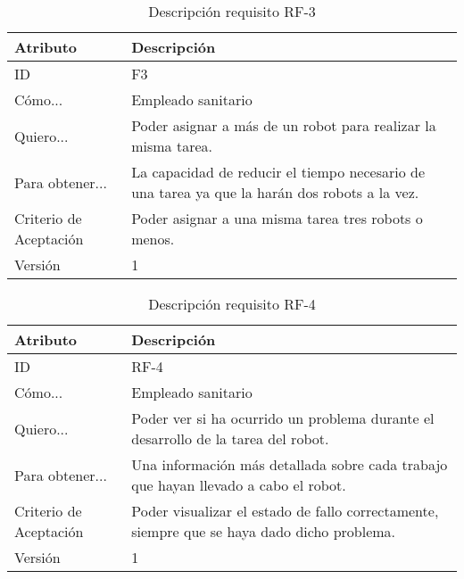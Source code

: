 \begin{table}[H]
    \label{tab:reqF3}
 	\caption{Descripción requisito RF-3}
	\centering
	
	\begin{tabular}{C{3cm}|C{12cm}}
 		\toprule
 		\textbf{Atributo} & \textbf{Descripción} \\
 		\midrule
 	    ID & F3 \\
 	    Cómo... & Empleado sanitario \\
 	    Quiero... & Poder asignar a más de un robot para realizar la misma tarea. \\
 	    Para obtener... & La capacidad de reducir el tiempo necesario de una tarea ya que la harán dos robots a la vez.  \\
 	    Criterio de Aceptación & Poder asignar a una misma tarea tres robots o menos. \\
 	    Versión & 1 \\
 		\bottomrule
 		\end{tabular}
\end{table}

\begin{table}[H]
    \label{tab:reqF4}
 	\caption{Descripción requisito RF-4}
	\centering
	
	\begin{tabular}{C{3cm}|C{12cm}}
 		\toprule
 		\textbf{Atributo} & \textbf{Descripción} \\
 		\midrule
 	    ID & RF-4 \\
 	    Cómo... & Empleado sanitario \\
 	    Quiero... & Poder ver si ha ocurrido un problema durante el desarrollo de la tarea del robot.\\
 	    Para obtener... & Una información más detallada sobre cada trabajo que hayan llevado a cabo el robot.  \\
 	    Criterio de Aceptación & Poder visualizar el estado de fallo correctamente, siempre que se haya dado dicho problema. \\
 	    Versión & 1 \\
 		\bottomrule
 		\end{tabular}
\end{table}



